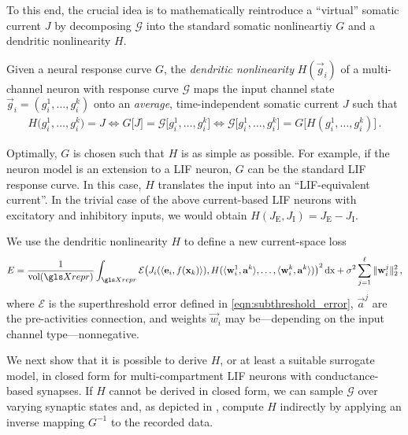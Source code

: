 To this end, the crucial idea is to mathematically reintroduce a \enquote{virtual} somatic current $J$ by decomposing $\mathscr{G}$ into the standard somatic nonlineartiy $G$ and a dendritic nonlinearity $H$.

\begin{definition}
\label{def:dendritic_nonlinearity}
Given a neural response curve $G$, the \emph{dendritic nonlinearity} $H(\vec g_i)$ of a multi-channel neuron with response curve $\mathscr{G}$ maps the input channel state $\vec g_i = (g^1_i, \ldots, g^k_i)$ onto an \emph{average}, time-independent somatic current $J$ such that
\begin{align}
		H\big(g^1_i, \ldots, g^k_i\big) = J
	\Leftrightarrow
		G\big[J\big] = \mathscr{G}\big[g^1_i, \ldots, g^k_i\big] 
	\Leftrightarrow
		\mathscr{G}\big[g^1_i, \ldots, g^k_i\big] = G\big[H(g^1_i, \ldots, g^k_i)\big] \,.
	\label{eqn:def_h}
\end{align}
\end{definition}
Optimally, $G$ is chosen such that $H$ is as simple as possible.
For example, if the neuron model is an extension to a LIF neuron, $G$ can be the standard LIF response curve.
In this case, $H$ translates the input into an \enquote{LIF-equivalent current}.
In the trivial case of the above current-based LIF neurons with excitatory and inhibitory inputs, we would obtain $H(J_\mathrm{E}, J_\mathrm{I}) = J_\mathrm{E} - J_\mathrm{I}$.

We use the dendritic nonlinearity $H$ to define a new current-space loss
\begin{align}
	E = \frac{1}{\vol(\Xrepr)} \int_{\Xrepr}
		\mathcal{E} \bigl(
			J_i(\langle \vec e_i, f(\vec x_k) \rangle),
			H(\langle \vec w^1_i, \vec a^k \rangle, \ldots, \langle \vec w^k_i, \vec a^k \rangle)
		\bigr)^2 \,\mathrm{dx} + \sigma^2 \sum_{j = 1}^\ell \| \vec w^j_i \|_2^2\,,
\label{eqn:decode_nonlinear_synapses}
\end{align}
where $\mathcal{E}$ is the superthreshold error defined in \cref{eqn:subthreshold_error}, $\vec a^j$ are the pre-activities connection, and weights $\vec w_i$ may be---depending on the input channel type---nonnegative.

We next show that it is possible to derive $H$, or at least a suitable surrogate model, in closed form for multi-compartment LIF neurons with conductance-based synapses.
If $H$ cannot be derived in closed form, we can sample $\mathscr{G}$ over varying synaptic states and, as depicted in , compute $H$ indirectly by applying an inverse mapping $G^{-1}$ to the recorded data.
